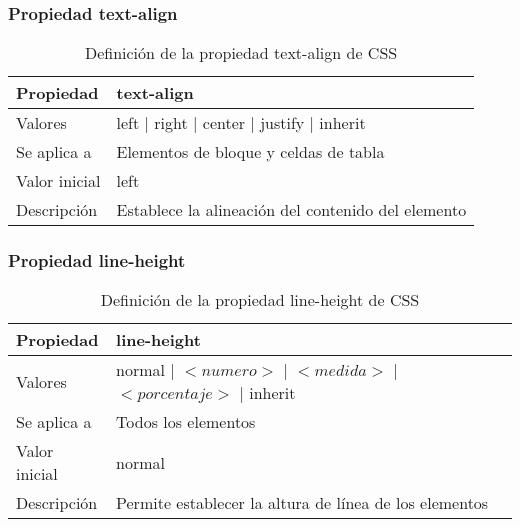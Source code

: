 \begin{frame}
\frametitle{Propiedad text-align}

\begin{center}
  \begin{table}
   \begin{tabular}{p{1.8cm}p{7.8cm}}
Propiedad & \bf{text-align} \\ \hline
Valores& left | right | center | justify | inherit \\ \hline
Se aplica a& Elementos de bloque y celdas de tabla \\ \hline
Valor inicial& left \\ \hline
Descripción& Establece la alineación del contenido del elemento \\ \hline
  \end{tabular}
   \caption{Definición de la propiedad text-align de CSS}
 \end{table}
\end{center}


\end{frame}



\begin{frame}
\frametitle{Propiedad line-height}

\begin{center}
  \begin{table}
   \begin{tabular}{p{1.8cm}p{7.8cm}}
Propiedad & \bf{line-height} \\ \hline
Valores& normal | $<numero>$ | $<medida>$ | $<porcentaje>$ | inherit \\ \hline
Se aplica a& Todos los elementos \\ \hline
Valor inicial& normal \\ \hline
Descripción& Permite establecer la altura de línea de los elementos \\ \hline
  \end{tabular}
   \caption{Definición de la propiedad line-height de CSS}
 \end{table}
\end{center}


\end{frame}



